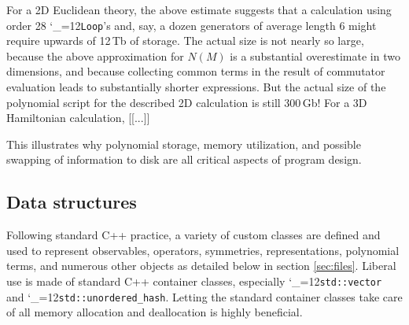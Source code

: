 \documentclass [12pt]{article}
\makeatletter
\renewcommand{\tt}{\begingroup\catcode`_=12\def\_{\string_}\tt@}
\newcommand{\tt@}[1]{\texttt{#1}\endgroup}
\makeatother
\begin{document}
For a 2D Euclidean theory,
the above estimate suggests that a calculation using
order 28 \tt{Loop}'s and, say, a dozen generators
of average length 6 might require upwards of
12\,Tb of storage.
The actual size is not nearly so large, because
the above approximation for $N(M)$ is a substantial
overestimate in two dimensions, and because collecting
common terms in the result of commutator evaluation
leads to substantially shorter expressions.
But the actual size of the polynomial script
for the described 2D calculation is still 300\,Gb!
For a 3D Hamiltonian calculation, [[...]]

This illustrates why polynomial storage, memory utilization,
and possible swapping of information to disk are all
critical aspects of program design.

\subsection{Data structures}

Following standard C++ practice, a variety of custom
classes are defined and used to represent observables,
operators, symmetries, representations, polynomial terms,
and numerous other objects as detailed below in section \ref{sec:files}.
Liberal use is made of standard C++ container classes, especially
\tt{std::vector} and \tt{std::unordered_hash}.
Letting the standard container classes take care of all memory
allocation and deallocation is highly beneficial.
\end{document}
